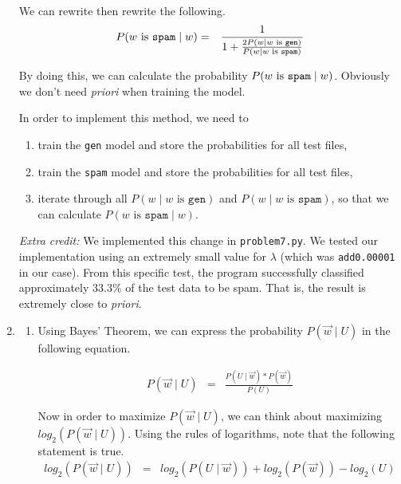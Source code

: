 \documentclass[11pt]{article}
\begin{document}
\begin{enumerate}
	We can rewrite then rewrite the following.
	\begin{eqnarray*}
		P(w \text{ is \texttt{spam}} \mid w) &=& \frac{1}{1 + \frac{2P(w \mid w \text{ is \texttt{gen}})}{P(w \mid w \text{ is \texttt{spam}})}}
	\end{eqnarray*}

	By doing this, we can calculate the probability $P(w \text{ is \texttt{spam}} \mid w)$. Obviously we don't need \textit{priori} when training the model.

	In order to implement this method, we need to
	\begin{enumerate}[label=\roman*.]
		\item
			train the \texttt{gen} model and store the probabilities for all test files,
		\item
			train the \texttt{spam} model and store the probabilities for all test files,
		\item
			iterate through all $P(w \mid w \text{ is } \texttt{gen})$ and $P(w \mid w \text{ is } \texttt{spam})$, so that we can calculate $P(w \text{ is } \texttt{spam} \mid w)$.

	\end{enumerate}

	\textit{Extra credit:} We implemented this change in \texttt{problem7.py}. We tested our implementation using an extremely small value for $\lambda$ (which was \texttt{add0.00001} in our case). From this specific test, the program successfully classified approximately $33.3\%$ of the test data to be spam. That is, the result is extremely close to \textit{priori}.

\item %
	\begin{enumerate}[label=(\alph*)]
	\item
		Using Bayes’ Theorem, we can express the probability $P(\vec{w} \mid U)$ in the following equation.

		\begin{eqnarray*}
			P(\vec{w} \mid U) &=& \frac{P(U \mid \vec{w}) * P(\vec{w})}{P(U)}
		\end{eqnarray*}

		Now in order to maximize $P(\vec{w} \mid U)$, we can think about maximizing $log_2(P(\vec{w} \mid U))$. Using the rules of logarithms, note that the following statement is true.
		\begin{eqnarray*}
			log_2(P(\vec{w} \mid U)) &=& log_2(P(U \mid \vec{w})) + log_2(P(\vec{w})) - log_2(U)
		\end{eqnarray*}


\end{enumerate}
\end{enumerate}
\end{document}
